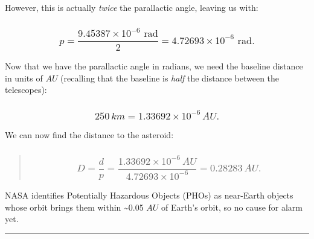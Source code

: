 \documentclass[
]{article}
\begin{document}
However, this is actually \emph{twice} the parallactic angle, leaving us
with:

\hypertarget{p-frac9.45387-times-10--6textrad2-4.72693-times-10--6textrad.}{%
\subsubsection{\texorpdfstring{{\[p = \frac{9.45387 \times 10^{- 6}\text{~rad}}{2} = 4.72693 \times 10^{- 6}\text{~rad.}\]}}{p = \textbackslash frac\{9.45387 \textbackslash times 10\^{}\{- 6\}\textbackslash text\{\textasciitilde rad\}\}\{2\} = 4.72693 \textbackslash times 10\^{}\{- 6\}\textbackslash text\{\textasciitilde rad.\}}}\label{p-frac9.45387-times-10--6textrad2-4.72693-times-10--6textrad.}}

Now that we have the parallactic angle in radians, we need the baseline
distance in units of {\(AU\)} (recalling that the baseline is
\emph{half} the distance between the telescopes):

\hypertarget{km-1.33692-times-10--6-au.}{%
\subsubsection{\texorpdfstring{{\[250\, km = 1.33692 \times 10^{- 6}\, AU.\]}}{250\textbackslash, km = 1.33692 \textbackslash times 10\^{}\{- 6\}\textbackslash, AU.}}\label{km-1.33692-times-10--6-au.}}

We can now find the distance to the asteroid:

\begin{quote}
\hypertarget{d-fracdp-frac1.33692-times-10--6-au4.72693-times-10--6-0.28283-au.}{%
\subsubsection{\texorpdfstring{{\[D = \frac{d}{p} = \frac{1.33692 \times 10^{- 6}\, AU}{4.72693 \times 10^{- 6}} = 0.28283\, AU.\]}}{D = \textbackslash frac\{d\}\{p\} = \textbackslash frac\{1.33692 \textbackslash times 10\^{}\{- 6\}\textbackslash, AU\}\{4.72693 \textbackslash times 10\^{}\{- 6\}\} = 0.28283\textbackslash, AU.}}\label{d-fracdp-frac1.33692-times-10--6-au4.72693-times-10--6-0.28283-au.}}
\end{quote}

NASA identifies Potentially Hazardous Objects (PHOs) as near-Earth
objects whose orbit brings them within \textasciitilde0.05 {\(AU\)} of
Earth's orbit, so no cause for alarm yet.

\begin{center}\rule{0.5\linewidth}{0.5pt}\end{center}
\end{document}
